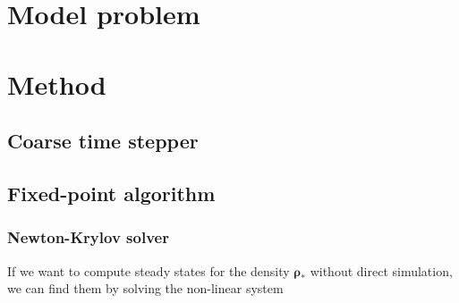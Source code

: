 \documentclass[]{article}
\newcommand{\U}{\ensuremath{\boldsymbol{\rho}}}
\theoremstyle{definition}
\begin{document}
 
\section{Model problem}



\section{Method}
\subsection{Coarse time stepper}



\subsection{Fixed-point algorithm}

\subsubsection{Newton-Krylov solver} \label{sec:Newton-Krylov}


If we want to compute steady states for the density $\U_*$ without direct simulation, we can find them by solving the non-linear system
\end{document}
